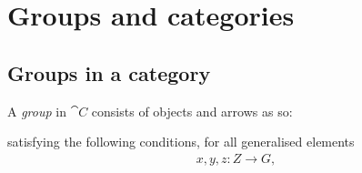 \documentclass{article}
\begin{document}
\section{Groups and categories}

\subsection{Groups in a category}

\begin{definition}
    A \emph{group} in $\cat C$ consists of objects and arrows as so:

    \begin{center}
    \end{center}

    satisfying the following conditions, for all generalised elements
    \begin{align*}
        x,y,z:Z\to G,
    \end{align*}


\end{definition}
\end{document}
